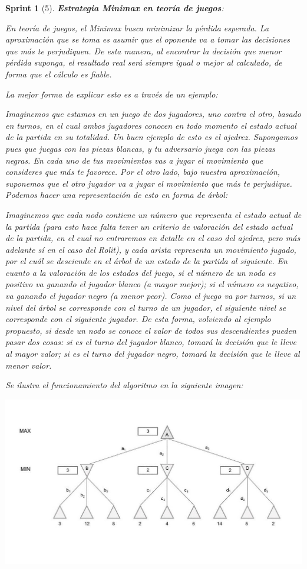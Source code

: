 \documentclass[12pt,a4paper,openright]{book}
\theoremstyle{break}
\newtheorem*{sprint}{Sprint}
\begin{document}
\begin{sprint}[5]
\textbf{Estrategia Minimax en teoría de juegos}: 

En teoría de juegos, el Minimax busca minimizar la pérdida esperada. La aproximación que se toma es asumir que el oponente va a tomar las decisiones que más te perjudiquen. De esta manera, al encontrar la decisión que menor pérdida suponga, el resultado real será siempre igual o mejor al calculado, de forma que el cálculo es fiable.

La mejor forma de explicar esto es a través de un ejemplo:

Imaginemos que estamos en un juego de dos jugadores, uno contra el otro, basado en turnos, en el cual ambos jugadores conocen en todo momento el estado actual de la partida en su totalidad. Un buen ejemplo de esto es el ajedrez. Supongamos pues que juegas con las piezas blancas, y tu adversario juega con las piezas negras. En cada uno de tus movimientos vas a jugar el movimiento que consideres que más te favorece. Por el otro lado, bajo nuestra aproximación, suponemos que el otro jugador va a jugar el movimiento que más te perjudique. Podemos hacer una representación de esto en forma de árbol:

Imaginemos que cada nodo contiene un número que representa el estado actual de la partida (para esto hace falta tener un criterio de valoración del estado actual de la partida, en el cual no entraremos en detalle en el caso del ajedrez, pero más adelante sí en el caso del Rolit), y cada arista representa un movimiento jugado, por el cuál se desciende en el árbol de un estado de la partida al siguiente. En cuanto a la valoración de los estados del juego, si el número de un nodo es positivo va ganando el jugador blanco (a mayor mejor); si el número es negativo, va ganando el jugador negro (a menor peor). Como el juego va por turnos, si un nivel del árbol se corresponde con el turno de un jugador, el siguiente nivel se corresponde con el siguiente jugador. De esta forma, volviendo al ejemplo propuesto, si desde un nodo se conoce el valor de todos sus descendientes pueden pasar dos cosas: si es el turno del jugador blanco, tomará la decisión que le lleve al mayor valor; si es el turno del jugador negro, tomará la decisión que le lleve al menor valor. 

Se ilustra el funcionamiento del algoritmo en la siguiente imagen: 

\begin{center}
\centering
\includegraphics[scale=0.5]{minimaxExample.jpg}
\end{center}


\end{sprint}
\end{document}
